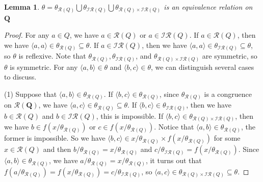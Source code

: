 \documentclass[12pt]{amsart}
\newtheorem{lemma}{Lemma}[section]
\theoremstyle{definition}
\theoremstyle{remark}
\numberwithin{equation}{section}
\begin{document}
\begin{lemma}\label{l5.8}
$\theta=\theta_{\mathscr{R}(Q)}\bigcup \theta_{\mathscr{IR}(Q)} \bigcup \theta_{\mathscr{R}(Q)\times \mathscr{IR}(Q)}$ is an equivalence relation on $\mathbf{Q}$
\end{lemma}


\begin{proof}
For any $a\in Q$, we have $a\in \mathscr{R}(Q)$ or $a\in \mathscr{IR}(Q)$. If $a\in \mathscr{R}(Q)$, then we have $\langle a, a\rangle\in \theta_{\mathscr{R}(Q)} \subseteq \theta$. If $a\in \mathscr{IR}(Q)$, then we have $\langle a, a\rangle\in \theta_{\mathscr{IR}(Q)} \subseteq \theta$, so $\theta$ is reflexive. Note that $\theta_{\mathscr{R}(Q)}, \theta_{\mathscr{IR}(Q)}$, and $\theta_{\mathscr{R}(Q)\times \mathscr{IR}(Q)}$ are symmetric, so $\theta$ is symmetric. For any $\langle a,b\rangle \in \theta$ and $\langle b,c\rangle \in \theta$, we can distinguish several cases to discuss.


(1) Suppose that $\langle a,b \rangle\in \theta_{\mathscr{R}(Q)}$.  If $\langle b,c \rangle\in \theta_{\mathscr{R}(Q)}$, since $\theta_{\mathscr{R}(Q)}$ is a congruence on $\mathscr{R}(\mathbf{Q})$, we have $\langle a,c \rangle\in \theta_{\mathscr{R}(Q)}\subseteq\theta$.  If $\langle b,c \rangle\in \theta_{\mathscr{IR}(Q)}$, then we have $b\in \mathscr{R}(Q)$ and $b\in \mathscr{IR}(Q)$, this is impossible.  If $\langle b,c \rangle\in \theta_{\mathscr{R}(Q)\times \mathscr{IR}(Q)}$, then we have $b\in f(x/\theta_{\mathscr{R}(Q)})$ or $c\in f(x/\theta_{\mathscr{R}(Q)})$. Notice that $\langle a,b\rangle\in \theta_{\mathscr{R}(Q)}$, the former is impossible.
So we have $\langle b,c \rangle\in x/\theta_{\mathscr{R}(Q)}\times f(x/\theta_{\mathscr{R}(Q)})$ for some $x\in \mathscr{R}(Q)$ and then $b/\theta_{\mathscr{R}(Q)}=x/\theta_{\mathscr{R}(Q)}$ and $c/\theta_{\mathscr{IR}(Q)}=f(x/\theta_{\mathscr{R}(Q)})$.
Since $\langle a,b \rangle\in \theta_{\mathscr{R}(Q)}$, we have $a/\theta_{\mathscr{R}(Q)}=x/\theta_{\mathscr{R}(Q)}$, it turns out that $f(a/\theta_{\mathscr{R}(Q)})=f(x/\theta_{\mathscr{R}(Q)})=c/\theta_{\mathscr{IR}(Q)}$, so $\langle a,c\rangle\in \theta_{\mathscr{R}(Q)\times \mathscr{IR}(Q)}\subseteq\theta$.



\end{proof}
\end{document}
